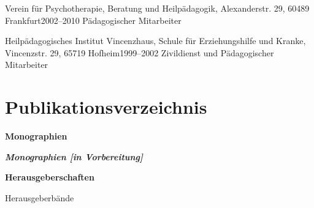     \resumeSubheading
      {Verein für Psychotherapie, Beratung und Heilpädagogik, Alexanderstr. 29, 60489 Frankfurt}{2002–2010}
      {Pädagogischer Mitarbeiter}{}

    \resumeSubheading
      {Heilpädagogisches Institut Vincenzhaus, Schule für Erziehungshilfe und Kranke, Vincenzstr. 29, 65719 Hofheim}{1999–2002}
      {Zivildienst und Pädagogischer Mitarbeiter}{}
  \resumeSubHeadingListEnd


\section{Publikationsverzeichnis}
  \vspace{3pt}
  \resumeSubHeadingListStart
\resumeProjectHeading
      {\textbf{Monographien}}{}

    \resumeItemListStart
    \resumeItemListEnd

{\itshape\bfseries\small Monographien [in Vorbereitung]}\par\vspace{2pt}
    \resumeItemListStart
    \resumeItemListEnd

    \resumeProjectHeading
      {\textbf{Herausgeberschaften}}{}

    \resumeSubSubheading
      {Herausgeberbände}{}

